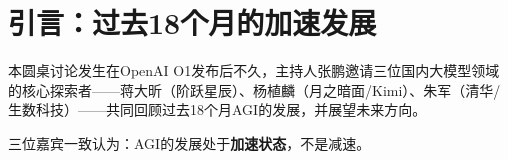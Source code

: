 \section{引言：过去18个月的加速发展}

本圆桌讨论发生在OpenAI O1发布后不久，主持人张鹏邀请三位国内大模型领域的核心探索者——蒋大昕（阶跃星辰）、杨植麟（月之暗面/Kimi）、朱军（清华/生数科技）——共同回顾过去18个月AGI的发展，并展望未来方向。

三位嘉宾一致认为：AGI的发展处于\textbf{加速状态}，不是减速。



